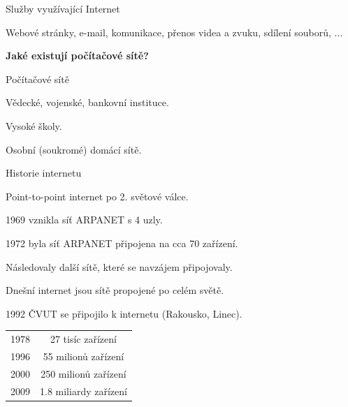 \documentclass[aspectratio=1610]{beamer}
\begin{document}
\begin{frame}{Služby využívající Internet}
    \begin{cardTiny}
        \begin{center}
            Webové stránky, e-mail, komunikace, přenos videa a zvuku, sdílení souborů, ...
        \end{center}
    \end{cardTiny}
    \begin{cardTiny}
        \begin{flushleft}
        \begin{center}
            \textbf{Jaké existují počítačové sítě?}
        \end{center}
        \end{flushleft}
    \end{cardTiny}
\end{frame}

\begin{frame}{Počítačové sítě}
    \begin{cardTiny}
        \begin{center}
            Vědecké, vojenské, bankovní instituce.

            Vysoké školy.

            Osobní (soukromé) domácí sítě.
        \end{center}
    \end{cardTiny}
\end{frame}

\begin{frame}{Historie internetu}
    \begin{cardTiny}
        \begin{flushleft}
            Point-to-point internet po 2. světové válce.

            1969 vznikla síť ARPANET s 4 uzly.

            1972 byla síť ARPANET připojena na cca 70 zařízení.

            Následovaly další sítě, které se navzájem připojovaly.

            Dnešní internet jsou sítě propojené po celém světě.

            1992 ČVUT se připojilo k internetu (Rakousko, Linec).
        \end{flushleft}
    \end{cardTiny}
    \begin{cardTiny}
        \begin{center}
            \begin{tabular}{ |c|c| } 
                \hline
                1978 & 27 tisíc zařízení        \\
                1996 & 55 milionů zařízení      \\
                2000 & 250 milionů zařízení     \\
                2009 & 1.8 miliardy zařízení    \\
                \hline
            \end{tabular}
        \end{center}
    \end{cardTiny}
\end{frame}
\end{document}
